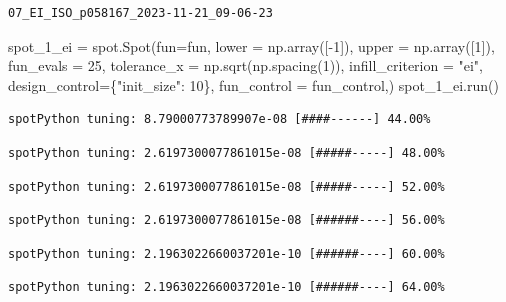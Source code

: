 \documentclass[
  letterpaper,
  DIV=11,
  numbers=noendperiod]{scrreprt}
\newenvironment{Shaded}{\begin{snugshade}}{\end{snugshade}}
\newcommand{\DecValTok}[1]{\textcolor[rgb]{0.68,0.00,0.00}{#1}}
\newcommand{\NormalTok}[1]{\textcolor[rgb]{0.00,0.23,0.31}{#1}}
\newcommand{\OperatorTok}[1]{\textcolor[rgb]{0.37,0.37,0.37}{#1}}
\newcommand{\StringTok}[1]{\textcolor[rgb]{0.13,0.47,0.30}{#1}}
\begin{document}
\begin{verbatim}
07_EI_ISO_p058167_2023-11-21_09-06-23
\end{verbatim}

\begin{Shaded}
\begin{Highlighting}[]
\NormalTok{spot\_1\_ei }\OperatorTok{=}\NormalTok{ spot.Spot(fun}\OperatorTok{=}\NormalTok{fun,}
\NormalTok{                   lower }\OperatorTok{=}\NormalTok{ np.array([}\OperatorTok{{-}}\DecValTok{1}\NormalTok{]),}
\NormalTok{                   upper }\OperatorTok{=}\NormalTok{ np.array([}\DecValTok{1}\NormalTok{]),}
\NormalTok{                   fun\_evals }\OperatorTok{=} \DecValTok{25}\NormalTok{,}
\NormalTok{                   tolerance\_x }\OperatorTok{=}\NormalTok{ np.sqrt(np.spacing(}\DecValTok{1}\NormalTok{)),}
\NormalTok{                   infill\_criterion }\OperatorTok{=} \StringTok{"ei"}\NormalTok{,}
\NormalTok{                   design\_control}\OperatorTok{=}\NormalTok{\{}\StringTok{"init\_size"}\NormalTok{: }\DecValTok{10}\NormalTok{\},}
\NormalTok{                   fun\_control }\OperatorTok{=}\NormalTok{ fun\_control,)}
\NormalTok{spot\_1\_ei.run()}
\end{Highlighting}
\end{Shaded}

\begin{verbatim}
spotPython tuning: 8.79000773789907e-08 [####------] 44.00% 
\end{verbatim}

\begin{verbatim}
spotPython tuning: 2.6197300077861015e-08 [#####-----] 48.00% 
\end{verbatim}

\begin{verbatim}
spotPython tuning: 2.6197300077861015e-08 [#####-----] 52.00% 
\end{verbatim}

\begin{verbatim}
spotPython tuning: 2.6197300077861015e-08 [######----] 56.00% 
\end{verbatim}

\begin{verbatim}
spotPython tuning: 2.1963022660037201e-10 [######----] 60.00% 
\end{verbatim}

\begin{verbatim}
spotPython tuning: 2.1963022660037201e-10 [######----] 64.00% 
\end{verbatim}
\end{document}
